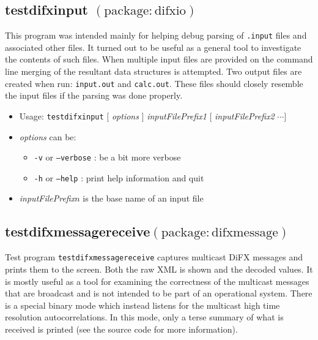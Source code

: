 
\subsection{testdifxinput {\small $\mathrm{(package: difxio)}$}} \label{sec:testdifxinput}

This program was intended mainly for helping debug parsing of {\tt .input} files and associated other files.
It turned out to be useful as a general tool to investigate the contents of such files.
When multiple input files are provided on the command line merging of the resultant data structures is attempted.
Two output files are created when run: {\tt input.out} and {\tt calc.out}.
These files should closely resemble the input files if the parsing was done properly.

\begin{itemize}
\item[] Usage: {\tt testdifxinput} $[$ {\em options} $]$ {\em inputFilePrefix1} $[$ {\em inputFilePrefix2} $ \cdots ]$
\item[] {\em options} can be:
\begin{itemize}
\item[] {\tt -v} or {\tt --verbose} : be a bit more verbose
\item[] {\tt -h} or {\tt --help} : print help information and quit
\end{itemize}
\item[] {\em inputFilePrefix}$n$ is the base name of an input file
\end{itemize}







\subsection{testdifxmessagereceive{\small $\mathrm{(package: difxmessage)}$}} \label{sec:testdifxmessagereceive}

Test program {\tt testdifxmessagereceive} captures multicast DiFX messages and prints them to the screen.
Both the raw XML is shown and the decoded values.
It is mostly useful as a tool for examining the correctness of the multicast messages that are broadcast and is not intended to be part of an operational system.
There is a special binary mode which instead listens for the multicast high time resolution autocorrelations.
In this mode, only a terse summary of what is received is printed (see the source code for more information).


